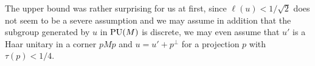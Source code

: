 The upper bound was rather surprising for us at first, since $\ell(u)< 1/\sqrt{2}$ does not seem to be a severe assumption and we may assume in addition that the subgroup generated by $u$ in ${\rm PU}(M)$ is discrete, we may even assume that $u'$ is a Haar unitary in a corner $pMp$ and $u = u' + p^{\perp}$ for a projection $p$ with $\tau(p)<1/4$.

